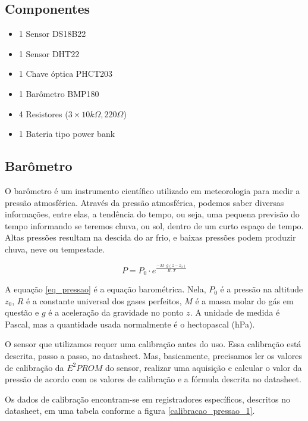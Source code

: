 \documentclass[twocolumn,11pt]{article}
\begin{document}
{\subsection{Componentes}\label{desenvolvimento_componentes}
\begin{itemize}
\item 1 Sensor DS18B22
\item 1 Sensor DHT22
\item 1 Chave óptica PHCT203
\item 1 Barômetro BMP180
\item 4 Resistores (\(3 \times 10 k\Omega, 220 \Omega\))
\item 1 Bateria tipo power bank
\end{itemize}

\subsection{Barômetro}\label{desenvolvimento_barometro}
O barômetro é um instrumento científico utilizado em meteorologia para medir a pressão atmosférica. Através da pressão atmosférica, podemos saber diversas informações, entre elas, a tendência do tempo, ou seja, uma pequena previsão do tempo informando se teremos chuva, ou sol, dentro de um curto espaço de tempo. Altas pressões resultam na descida do ar frio, e baixas pressões podem produzir chuva, neve ou tempestade.\par

\begin{equation}\label{eq_pressao}
P=P_0 \cdot e^\frac{-M \cdot g(z-z_0)}{R \cdot T}
\end{equation}

A equação \ref{eq_pressao} é a equação barométrica. Nela, $P_0$ é a pressão na altitude $z_0$, $R$ é a constante universal dos gases perfeitos, $M$ é a massa molar do gás em questão e $g$ é a aceleração da gravidade no ponto $z$. A unidade de medida é Pascal, mas a quantidade usada normalmente é o hectopascal (hPa).\par

O sensor que utilizamos requer uma calibração antes do uso. Essa calibração está descrita, passo a passo, no datasheet. Mas, basicamente, precisamos ler os valores de calibração da $E^2PROM$ do sensor, realizar uma aquisição e calcular o valor da pressão de acordo com os valores de calibração e a fórmula descrita no datasheet.\par

Os dados de calibração encontram-se em registradores específicos, descritos no datasheet, em uma tabela conforme a figura \ref{calibracao_pressao_1}.

}
\end{document}
